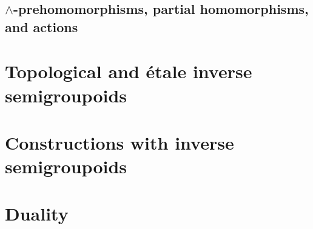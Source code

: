 \documentclass[a4paper]{amsart}
\theoremstyle{plain}    \newtheorem{theorem}[generalnumbering]{Theorem}
\theoremstyle{plain}    \newtheorem{corollary}[generalnumbering]{Corollary}
\theoremstyle{definition}   \newtheorem{definition}[generalnumbering]{Definition}
\theoremstyle{definition}   \newtheorem{example}[generalnumbering]{Example}
\theoremstyle{plain}    \newtheorem{proposition}[generalnumbering]{Proposition}
\theoremstyle{plain}    \newtheorem{lemma}[generalnumbering]{Lemma}
\theoremstyle{plain}    \newtheorem{plainstyle}[generalnumbering]{\namefordifferentenvironment}
\theoremstyle{plain}    \newtheorem*{plainstyle*}{\namefordifferentenvironment}
\theoremstyle{definition}    \newtheorem{definitionstyle}[generalnumbering]{\namefordifferentenvironment}
\theoremstyle{definition}    \newtheorem*{definitionstyle*}{\namefordifferentenvironment}
\begin{document}
\subsection{\texorpdfstring{$\land$}{∧}-prehomomorphisms, partial homomorphisms, and actions}\label{sec:dualprehomomorphisms}



\section{Topological and étale inverse semigroupoids}


\section{Constructions with inverse semigroupoids}\label{sec:categoricalconstructions}


\section{Duality}\label{sec:duality}




\end{document}
